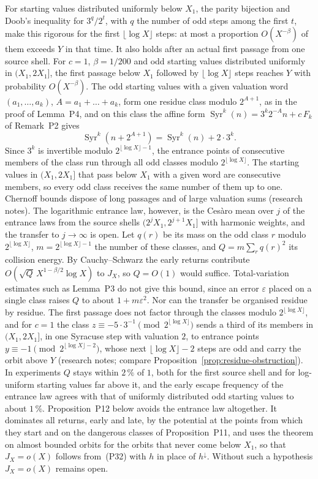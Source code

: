\documentclass[11pt]{article}
\theoremstyle{remark}
\begin{document}
For starting values distributed uniformly below $X_1$, the parity bijection and Doob's inequality for $3^{q}/2^t$, with $q$ the number of odd steps among the first $t$, make this rigorous for the first $\lfloor\log X\rfloor$ steps: at most a proportion $O(X^{-\beta})$ of them exceeds $Y$ in that time. It also holds after an actual first passage from one source shell. For $c=1$, $\beta=1/200$ and odd starting values distributed uniformly in $(X_1,2X_1]$, the first passage below $X_1$ followed by $\lfloor\log X\rfloor$ steps reaches $Y$ with probability $O(X^{-\beta})$. The odd starting values with a given valuation word $(a_1,\dots,a_k)$, $A=a_1+\dots+a_k$, form one residue class modulo $2^{A+1}$, as in the proof of Lemma~P4, and on this class the affine form $\operatorname{Syr}^k(n)=3^k2^{-A}n+c\,F_k$ of Remark~P2 gives
\[
 \operatorname{Syr}^k(n+2^{A+1})=\operatorname{Syr}^k(n)+2\cdot3^k.
\]
Since $3^k$ is invertible modulo $2^{\lfloor\log X\rfloor-1}$, the entrance points of consecutive members of the class run through all odd classes modulo $2^{\lfloor\log X\rfloor}$. The starting values in $(X_1,2X_1]$ that pass below $X_1$ with a given word are consecutive members, so every odd class receives the same number of them up to one. Chernoff bounds dispose of long passages and of large valuation sums (research notes). The logarithmic entrance law, however, is the Ces\`aro mean over $j$ of the entrance laws from the source shells $(2^jX_1,2^{j+1}X_1]$ with harmonic weights, and the transfer to $j\to\infty$ is open. Let $q(r)$ be its mass on the odd class $r$ modulo $2^{\lfloor\log X\rfloor}$, $m=2^{\lfloor\log X\rfloor-1}$ the number of these classes, and $Q=m\sum_rq(r)^2$ its collision energy. By Cauchy--Schwarz the early returns contribute $O(\sqrt Q\,X^{1-\beta/2}\log X)$ to $J_X$, so $Q=O(1)$ would suffice. Total-variation estimates such as Lemma~P3 do not give this bound, since an error $\varepsilon$ placed on a single class raises $Q$ to about $1+m\varepsilon^2$. Nor can the transfer be organised residue by residue. The first passage does not factor through the classes modulo $2^{\lfloor\log X\rfloor}$, and for $c=1$ the class $z\equiv-5\cdot3^{-1}\pmod{2^{\lfloor\log X\rfloor}}$ sends a third of its members in $(X_1,2X_1]$, in one Syracuse step with valuation $2$, to entrance points $y\equiv-1\pmod{2^{\lfloor\log X\rfloor-2}}$, whose next $\lfloor\log X\rfloor-2$ steps are odd and carry the orbit above $Y$ (research notes; compare Proposition~\ref{prop:residue-obstruction}). In experiments $Q$ stays within $2\,\%$ of $1$, both for the first source shell and for log-uniform starting values far above it, and the early escape frequency of the entrance law agrees with that of uniformly distributed odd starting values to about $1\,\%$. Proposition~P12 below avoids the entrance law altogether. It dominates all returns, early and late, by the potential at the points from which they start and on the dangerous classes of Proposition~P11, and uses the theorem on almost bounded orbits for the orbits that never come below $X_1$, so that $J_X=o(X)$ follows from~(P32) with $h$ in place of $h^\downarrow$. Without such a hypothesis $J_X=o(X)$ remains open.
\end{document}
